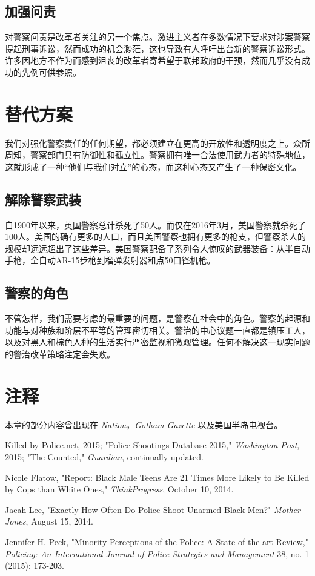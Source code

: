 \documentclass[fontset=fandol, a4paper, 12pt, openright]{ctexbook}
\begin{document}
\subsection{加强问责}
对警察问责是改革者关注的另一个焦点。激进主义者在多数情况下要求对涉案警察提起刑事诉讼，然而成功的机会渺茫，这也导致有人呼吁出台新的警察诉讼形式。许多因地方不作为而感到沮丧的改革者寄希望于联邦政府的干预，然而几乎没有成功的先例可供参照。

\section{替代方案}
我们对强化警察责任的任何期望，都必须建立在更高的开放性和透明度之上。众所周知，警察部门具有防御性和孤立性。警察拥有唯一合法使用武力者的特殊地位，这就形成了一种“他们与我们对立”的心态，而这种心态又产生了一种保密文化。

\subsection{解除警察武装}
自1900年以来，英国警察总计杀死了50人。而仅在2016年3月，美国警察就杀死了100人。美国的确有更多的人口，而且美国警察也拥有更多的枪支，但警察杀人的规模却远远超出了这些差异。美国警察配备了系列令人惊叹的武器装备：从半自动手枪，全自动AR-15步枪到榴弹发射器和点50口径机枪。

\subsection{警察的角色}
不管怎样，我们需要考虑的最重要的问题，是警察在社会中的角色。警察的起源和功能与对种族和阶层不平等的管理密切相关。警治的中心议题一直都是镇压工人，以及对黑人和棕色人种的生活实行严密监视和微观管理。任何不解决这一现实问题的警治改革策略注定会失败。

\section*{注释}
\begin{enumerate}[label={[\arabic*]}]
    \item 本章的部分内容曾出现在 \textit{Nation}，\textit{Gotham Gazette} 以及美国半岛电视台。
    \item Killed by Police.net, 2015; "Police Shootings Database 2015," \textit{Washington Post}, 2015; "The Counted," \textit{Guardian}, continually updated.
    \item Nicole Flatow, "Report: Black Male Teens Are 21 Times More Likely to Be Killed by Cops than White Ones," \textit{ThinkProgress}, October 10, 2014.
    \item Jaeah Lee, "Exactly How Often Do Police Shoot Unarmed Black Men?" \textit{Mother Jones}, August 15, 2014.
    \item Jennifer H. Peck, "Minority Perceptions of the Police: A State-of-the-art Review," \textit{Policing: An International Journal of Police Strategies and Management} 38, no. 1 (2015): 173-203.
\end{enumerate}
\end{document}
